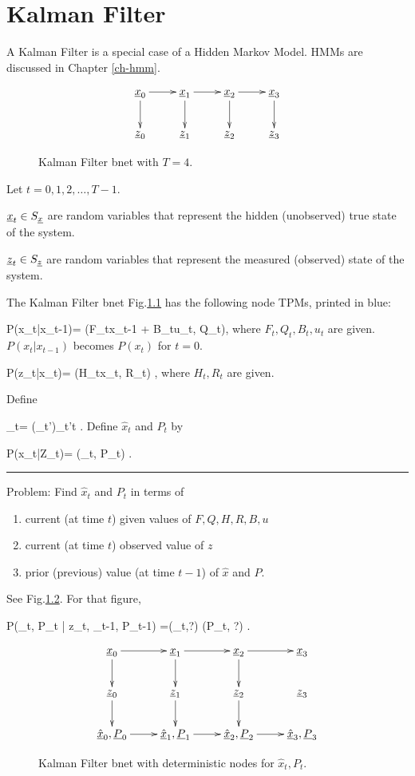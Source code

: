\chapter{Kalman Filter}\label{ch-kalman}

A Kalman Filter is a special case of a
Hidden Markov Model. HMMs are
 discussed in Chapter \ref{ch-hmm}.

\begin{figure}[h!]
\centering
$$\xymatrix{
\rvx_0\ar[d]\ar[r]&
\rvx_1\ar[d]\ar[r]&
\rvx_2\ar[d]\ar[r]&
\rvx_3\ar[d]\\
\rvz_0&
\rvz_1&
\rvz_2&
\rvz_3
}$$
\caption{Kalman Filter bnet with $T=4$.}
\label{fig-kal}
\end{figure}

Let $t=0, 1, 2, \dots , T-1$.

${\underline{x}}_t\in S_{\underline{x}}$ are
random variables that represent
the hidden (unobserved) true
state of the system.

${\underline{z}}_t\in S_{\underline{z}}$ are 
random variables that represent
the measured (observed) state of the system.


The Kalman Filter bnet Fig.\ref{fig-kal}
has the following
node TPMs,
printed in blue:


\beq\color{blue}
P(x_t|x_{t-1})=
\caln(F_tx_{t-1} + B_tu_t, Q_t)\;,
\eeq
where $F_t, Q_t, B_t, u_t$
are given. $P(x_t|x_{t-1})$ becomes $P(x_t)$
for $t=0$.

\beq\color{blue}
P(z_t|x_t)=
\caln(H_tx_t, R_t)
\;,
\eeq
where $H_t, R_t$ are given.

Define

\beq
\rvZ_t= (\rvz_{t'})_{t'\leq t}
\;.
\eeq
Define $\hat{x}_t$ and $P_t$ by

\beq
P(x_t|Z_t)=
\caln(_t, P_t)
\;.
\eeq
\hrule
\medskip
\noindent
Problem: Find $\hat{x}_t$ and $P_t$
in terms of 
\begin{enumerate}
\item
 current (at time $t$)
 given values of
$F,Q,H,R,
 B ,u$
\item
 current (at time $t$)
observed  value of 
$z$
\item
prior (previous)
value (at time $t-1$) of $\hat{x}$
and $P$.
\end{enumerate}
See Fig.\ref{fig-kal-plus}.
For that figure,

\beq \color{blue}
P(_t, P_t | z_t,
_{t-1}, P_{t-1})
=\delta(_t,?)
\delta(P_t, ?)
\;.
\eeq

\begin{figure}[h!]
\centering
$$\xymatrix{
\rvx_0\ar[d]\ar[r]&
\rvx_1\ar[d]\ar[r]&
\rvx_2\ar[d]\ar[r]&
\rvx_3\\
\rvz_0\ar[d]&
\rvz_1\ar[d]&
\rvz_2\ar[d]&
\rvz_3\\
\ul{\hat{x}}_0, 
\ul{P}_0\ar[r]&
\ul{\hat{x}}_1, 
\ul{P}_1\ar[r]&
\ul{\hat{x}}_2, 
\ul{P}_2\ar[r]&
\ul{\hat{x}}_3, 
\ul{P}_3
}$$
\caption{Kalman Filter bnet
with deterministic nodes for 
$\hat{x}_t, P_t$.}
\label{fig-kal-plus}
\end{figure}

